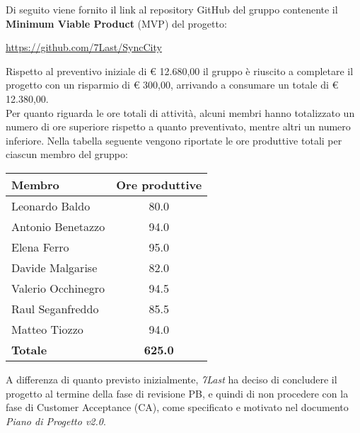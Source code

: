 \documentclass[italian,12pt]{article} %
\begin{document}
\begin{flushleft}
    Di seguito viene fornito il link al repository GitHub del gruppo contenente il \textbf{Minimum Viable Product} (MVP) del progetto:
    \begin{center}
        \url{https://github.com/7Last/SyncCity}
    \end{center}
    \newpage
    Rispetto al preventivo iniziale di € 12.680,00 il gruppo è riuscito a completare il progetto con un risparmio di € 300,00, arrivando a consumare un totale di € 12.380,00. \\
    Per quanto riguarda le ore totali di attività, alcuni membri hanno totalizzato un numero di ore superiore rispetto a quanto preventivato, mentre altri un numero inferiore. Nella tabella seguente vengono riportate le ore produttive totali per ciascun membro del gruppo:
    \begin{table}[!h]
        \footnotesize
        \begin{center}
            \vspace{0.5cm}
            \begin{tabular}{|l|c|}
                \hline
                \textbf{Membro} & \textbf{Ore produttive} \\
                \hline
                Leonardo Baldo & 80.0 \\
                Antonio Benetazzo & 94.0 \\
                Elena Ferro & 95.0 \\
                Davide Malgarise & 82.0 \\
                Valerio Occhinegro & 94.5 \\
                Raul Seganfreddo & 85.5 \\
                Matteo Tiozzo & 94.0 \\ 
                \hline
                \textbf{Totale} & \textbf{625.0} \\
                \hline
            \end{tabular}
        \end{center}
    \end{table}

    A differenza di quanto previsto inizialmente, \textit{7Last} ha deciso di concludere il progetto al termine della fase di revisione PB, e quindi di non procedere con la fase di Customer Acceptance (CA), come specificato e motivato nel documento \textit{Piano di Progetto v2.0}.
    
\end{flushleft}
\end{document}
